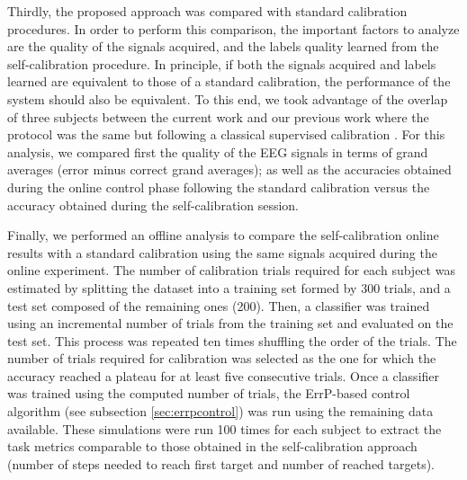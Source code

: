 Thirdly, the proposed approach was compared with standard calibration procedures. In order to perform this comparison, the important factors to analyze are the quality of the signals acquired, and the labels quality learned from the self-calibration procedure. In principle, if both the signals acquired and labels learned are equivalent to those of a standard calibration, the performance of the system should also be equivalent. To this end, we took advantage of the overlap of three subjects between the current work and our previous work where the protocol was the same but following a classical supervised calibration \cite{iturrate13}. For this analysis, we compared first the quality of the EEG signals in terms of grand averages (error minus correct grand averages); as well as the accuracies obtained during the online control phase following the standard calibration versus the accuracy obtained during the self-calibration session.

Finally, we performed an offline analysis to compare the self-calibration online results with a standard calibration using the same signals acquired during the online experiment. The number of calibration trials required for each subject was estimated by splitting the dataset into a training set formed by 300 trials, and a test set composed of the remaining ones (200). Then, a classifier was trained using an incremental number of trials from the training set and evaluated on the test set. This process was repeated ten times shuffling the order of the trials. The number of trials required for calibration was selected as the one for which the accuracy reached a plateau for at least five consecutive trials. Once a classifier was trained using the computed number of trials, the ErrP-based control algorithm (see subsection \ref{sec:errpcontrol}) was run using the remaining data available. These simulations were run 100 times for each subject to extract the task metrics comparable to those obtained in the self-calibration approach (number of steps needed to reach first target and number of reached targets).
